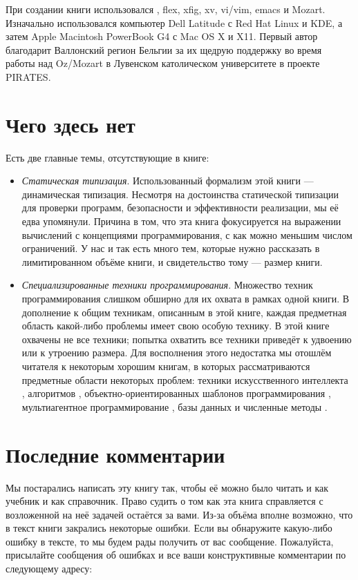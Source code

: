 При создании книги использовался \LaTeXe, flex, xfig, xv, vi/vim, emacs и Mozart. Изначально использовался компьютер Dell Latitude с Red Hat Linux и KDE, а затем Apple Macintosh PowerBook G4 с Mac OS X и X11. Первый автор благодарит Валлонский регион Бельгии за их щедрую поддержку во время работы над Oz/Mozart в Лувенском католическом университете в проекте PIRATES.

\section*{Чего здесь нет}

Есть две главные темы, отсутствующие в книге:

\begin{itemize}
\item{\emph{Статическая типизация}. Использованный формализм этой книги --- динамическая типизация. Несмотря на достоинства статической типизации для проверки программ, безопасности и эффективности реализации, мы её едва упомянули. Причина в том, что эта книга фокусируется на выражении вычислений с концепциями программирования, с как можно меньшим числом ограничений. У нас и так есть много тем, которые нужно рассказать в лимитированном объёме книги, и свидетельство тому --- размер книги.}

\item{\emph{Специализированные техники программирования}. Множество техник программирования слишком обширно для их охвата в рамках одной книги. В дополнение к общим техникам, описанным в этой книге, каждая предметная область какой-либо проблемы имеет свою особую технику. В этой книге охвачены не все техники; попытка охватить все техники приведёт к удвоению или к утроению размера. Для восполнения этого недостатка мы отошлём читателя к некоторым хорошим книгам, в которых рассматриваются предметные области некоторых проблем: техники искусственного интеллекта \cite{160, 136}, алгоритмов \cite{41}, объектно-ориентированных шаблонов программирования \cite{58}, мультиагентное программирование \cite{205}, базы данных \cite{42} и численные методы \cite{153}.}
\end{itemize}

\section*{Последние комментарии}

Мы постарались написать эту книгу так, чтобы её можно было читать и как учебник и как справочник. Право судить о том как эта книга справляется с возложенной на неё задачей остаётся за вами. Из-за объёма вполне возможно, что в текст книги закрались некоторые ошибки. Если вы обнаружите какую-либо ошибку в тексте, то мы будем рады получить от вас сообщение. Пожалуйста, присылайте сообщения об ошибках и все ваши конструктивные комментарии по следующему адресу:

